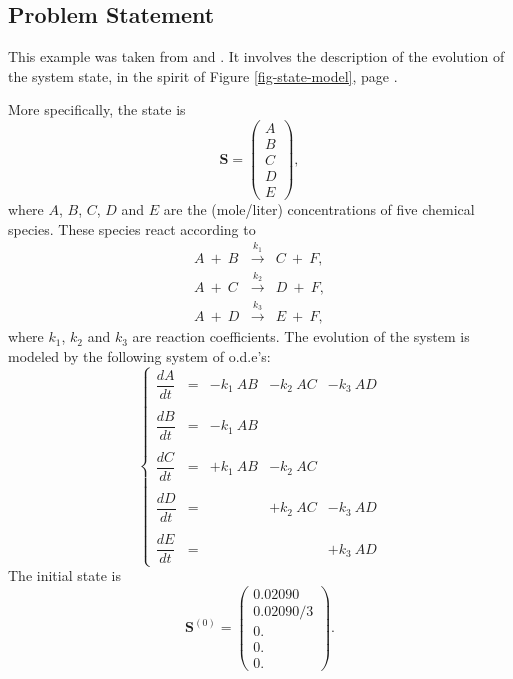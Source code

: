 \subsection{Problem Statement}

This example was taken from \cite{mcmctool} and \cite[ex. 9.9, page 326]{Hi70}.
It involves the description of the evolution of the system state, in the spirit of Figure \ref{fig-state-model}, page \pageref{fig-state-model}.

More specifically, the state is
\begin{equation*}
\mathbf{S}=
\left(
\begin{array}{c}
A \\
B \\
C \\
D \\
E
\end{array}
\right),
\end{equation*}
where $A$, $B$, $C$, $D$ and $E$ are the (mole/liter) concentrations of five chemical species.
These species react according to 
\begin{eqnarray*}
A~+~B & \xrightarrow{~k_1~} & C~+~F,\\
A~+~C & \xrightarrow{~k_2~} & D~+~F,\\
A~+~D & \xrightarrow{~k_3~} & E~+~F,
\end{eqnarray*}
where $k_1$, $k_2$ and $k_3$ are reaction coefficients.
The evolution of the system is modeled by the following system of o.d.e's:
\begin{equation*}
\left\{
\begin{array}{ccccc}
\dfrac{dA}{dt} & = & -k_1~AB & -k_2~AC & -k_3~AD \\
& & & & \\
\dfrac{dB}{dt} & = & -k_1~AB &         &         \\
& & & & \\
\dfrac{dC}{dt} & = & +k_1~AB & -k_2~AC &         \\
& & & & \\
\dfrac{dD}{dt} & = &         & +k_2~AC & -k_3~AD \\
& & & & \\
\dfrac{dE}{dt} & = &         &         & +k_3~AD
\end{array}
\right.
\end{equation*}
The initial state is
\begin{equation*}
\mathbf{S}^{(0)} =
\left(
\begin{array}{c}
0.02090   \\
0.02090/3 \\
0.        \\
0.        \\
0.
\end{array}
\right).
\end{equation*}

